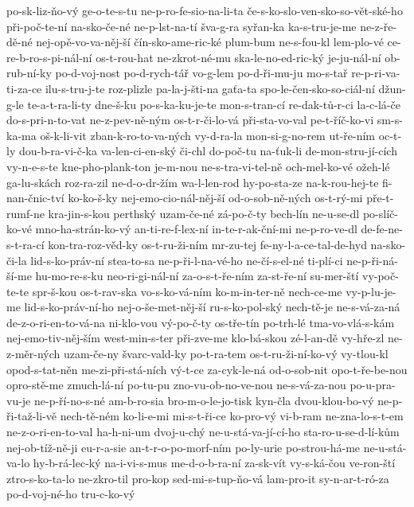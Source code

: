 {po-sk-liz-ňo-vý
ge-o-te-s-tu
ne-p-ro-fe-sio-na-li-ta
če-s-ko-slo-ven-sko-so-vět-ské-ho
při-poč-te-ní
na-sko-če-né
ne-p-lst-na-tí
šva-g-ra
syřan-ka
ka-s-tru-je-me
ne-z-ře-dě-né
nej-opě-vo-va-něj-ší
čín-sko-ame-ric-ké
plum-bum
ne-s-fou-kl
lem-plo-vé
ce-re-b-ro-s-pi-nál-ní
os-t-rou-hat
ne-zkrot-né-mu
ska-le-no-ed-ric-ký
je-ju-nál-ní
ob-rub-ní-ky
po-d-voj-nost
po-d-rych-tář
vo-g-lem
po-d-ři-mu-ju
mo-s-tař
re-p-ri-va-ti-za-ce
ilu-s-tru-j-te
roz-plizle
pa-la-j-šti-na
gaťa-ta
spo-le-čen-sko-so-ciál-ní
džun-g-le
te-a-t-ra-li-ty
dne-š-ku
po-s-ka-ku-je-te
mon-s-tran-cí
re-dak-tů-r-ci
la-c-lá-če
do-s-pri-n-to-vat
ne-z-pev-ně-ným
os-t-r-či-lo-vá
při-sta-vo-val
pe-t-říč-ko-vi
sm-s-ka-ma
oš-k-li-vit
zban-k-ro-to-va-ných
vy-d-ra-la
mon-si-g-no-rem
ut-ře-ním
oc-t-ly
dou-b-ra-vi-č-ka
va-len-ci-en-ský
či-chl
do-poč-tu
na-ťuk-li
de-mon-stru-jí-cích
vy-n-e-s-te
kne-pho-plank-ton
je-m-nou
ne-s-tra-vi-tel-ně
och-mel-ko-vé
ožeh-lé
ga-lu-skách
roz-ra-zil
ne-d-o-dr-žím
wa-l-len-rod
hy-po-sta-ze
na-k-rou-hej-te
fi-nan-čnic-tví
ko-ko-š-ky
nej-emo-cio-nál-něj-ší
od-o-sob-ně-ných
os-t-rý-mi
pře-t-rumf-ne
kra-jin-s-kou
perthský
uzam-če-né
zá-po-č-ty
bech-lín
ne-u-se-dl
po-slíč-ko-vé
mno-ha-strán-ko-vý
an-ti-re-f-lex-ní
in-te-r-ak-ční-mi
ne-p-ro-ve-dl
de-fe-ne-s-t-ra-cí
kon-tra-roz-věd-ky
os-t-ru-ži-ním
mr-zu-tej
fe-ny-l-a-ce-tal-de-hyd
na-sko-či-la
lid-s-ko-práv-ní
stea-to-sa
ne-p-ři-l-na-vé-ho
ne-čí-s-el-né
ti-plí-ci
ne-p-ři-ná-ší-me
hu-mo-re-s-ku
neo-ri-gi-nál-ní
za-o-s-t-ře-ním
za-st-ře-ní
su-mer-ští
vy-poč-te-te
spr-š-kou
os-t-rav-ska
vo-s-ko-vá-ním
ko-m-in-ter-ně
nech-ce-me
vy-p-lu-je-me
lid-s-ko-práv-ní-ho
nej-o-še-met-něj-ší
ru-s-ko-pol-ský
nech-tě-je
ne-s-vá-za-ná
de-z-o-ri-en-to-vá-na
ni-klo-vou
vý-po-č-ty
os-tře-tín
po-trh-lé
tma-vo-vlá-s-kám
nej-emo-tiv-něj-ším
west-min-s-ter
při-zve-me
klo-bá-skou
zé-l-an-dě
vy-hře-zl
ne-z-měr-ných
uzam-če-ny
švarc-vald-ky
po-t-ra-tem
os-t-ru-ži-ní-ko-vý
vy-tlou-kl
opod-s-tat-něn
me-zi-při-stá-ních
vý-t-ce
za-cyk-le-ná
od-o-sob-nit
opo-t-ře-be-nou
opro-stě-me
zmuch-lá-ní
po-tu-pu
zno-vu-ob-no-ve-nou
ne-s-vá-za-nou
po-u-pra-vu-je
ne-p-ří-no-s-né
am-b-ro-sia
bro-m-o-le-jo-tisk
kyn-čla
dvou-klou-bo-vý
ne-p-ři-taž-li-vě
nech-tě-ném
ko-li-e-mi
mi-s-t-ři-ce
ko-pro-vý
vi-b-ram
ne-zna-lo-s-t-em
ne-z-o-ri-en-to-val
ha-h-ni-um
dvoj-u-chý
ne-u-stá-va-jí-cí-ho
sta-ro-u-se-d-lí-kům
nej-ob-tíž-ně-ji
eu-r-a-sie
an-t-r-o-po-morf-ním
po-ly-urie
po-strou-há-me
ne-u-stá-va-lo
hy-b-rá-lec-ký
na-i-vi-s-mus
me-d-o-b-ra-ní
za-sk-vít
vy-s-ká-čou
ve-ron-ští
ztro-s-ko-ta-lo
ne-zkro-til
pro-kop
sed-mi-s-tup-ňo-vá
lam-pro-it
sy-n-ar-t-ró-za
po-d-voj-né-ho
tru-c-ko-vý
}
